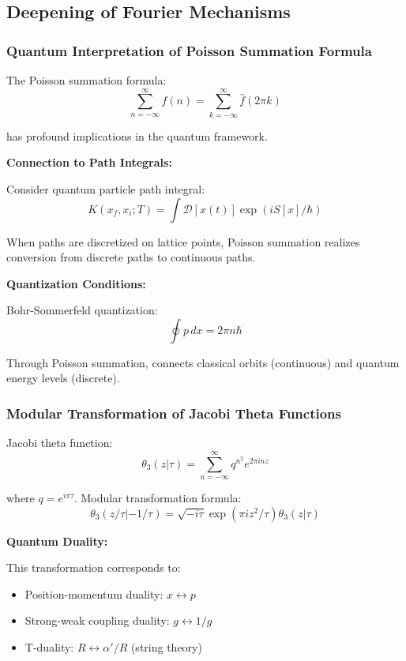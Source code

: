 \documentclass[11pt]{article}
\theoremstyle{plain}
\theoremstyle{definition}
\theoremstyle{remark}
\begin{document}
\subsection{Deepening of Fourier Mechanisms}

\subsubsection{Quantum Interpretation of Poisson Summation Formula}

The Poisson summation formula:
$$\sum_{n=-\infty}^{\infty} f(n) = \sum_{k=-\infty}^{\infty} \hat{f}(2\pi k)$$

has profound implications in the quantum framework.

\textbf{Connection to Path Integrals:}

Consider quantum particle path integral:
$$K(x_f, x_i; T) = \int \mathcal{D}[x(t)] \exp\left(i S[x]/\hbar\right)$$

When paths are discretized on lattice points, Poisson summation realizes conversion from discrete paths to continuous paths.

\textbf{Quantization Conditions:}

Bohr-Sommerfeld quantization:
$$\oint p \, dx = 2\pi n\hbar$$

Through Poisson summation, connects classical orbits (continuous) and quantum energy levels (discrete).

\subsubsection{Modular Transformation of Jacobi Theta Functions}

Jacobi theta function:
$$\theta_3(z|\tau) = \sum_{n=-\infty}^{\infty} q^{n^2} e^{2\pi inz}$$

where $q = e^{i\pi\tau}$. Modular transformation formula:
$$\theta_3(z/\tau|-1/\tau) = \sqrt{-i\tau} \exp(\pi iz^2/\tau) \theta_3(z|\tau)$$

\textbf{Quantum Duality:}

This transformation corresponds to:
\begin{itemize}
\item Position-momentum duality: $x \leftrightarrow p$
\item Strong-weak coupling duality: $g \leftrightarrow 1/g$
\item T-duality: $R \leftrightarrow \alpha'/R$ (string theory)
\end{itemize}
\end{document}
